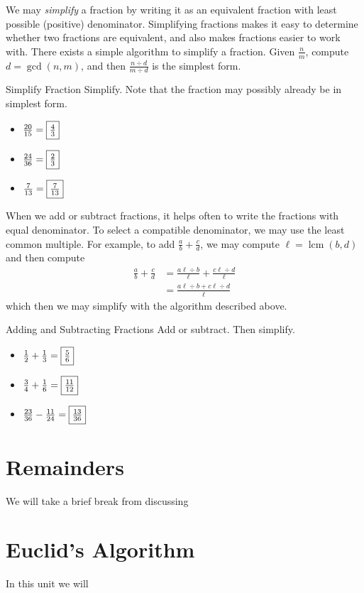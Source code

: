 \documentclass[a4paper,10pt]{report}
\begin{document}
We may \emph{simplify} a fraction by writing it as an equivalent fraction with
least possible (positive) denominator. Simplifying fractions makes it easy to
determine whether two fractions are equivalent, and also makes fractions easier
to work with. There exists a simple algorithm to simplify a fraction. Given
$\frac{n}{m}$, compute $d=\gcd(n, m)$, and then $\frac{n\div d}{m\div d}$ is the
simplest form.

\begin{problem}{Simplify Fraction}
 Simplify. Note that the fraction may possibly already be in simplest form.

 \begin{itemize}
  \item $\frac{20}{15}=\Ans{\frac{4}{3}}$
  \item $\frac{24}{36}=\Ans{\frac{2}{3}}$
  \item $\frac{7}{13}=\Ans{\frac{7}{13}}$
 \end{itemize}
\end{problem}

When we add or subtract fractions, it helps often to write the fractions with
equal denominator. To select a compatible denominator, we may use the least
common multiple. For example, to add $\frac{a}{b}+\frac{c}{d}$, we may compute
$\ell=\operatorname{lcm}(b, d)$ and then compute \begin{align*}
 \frac{a}{b}+\frac{c}{d}
 &= \frac{a\ell\div b}{\ell} + \frac{c\ell\div d}{\ell} \\
 &= \frac{a\ell\div b + c\ell\div d}{\ell}
\end{align*} which then we may simplify with the algorithm described above.

\begin{problem}{Adding and Subtracting Fractions}
 Add or subtract. Then simplify.

 \begin{itemize}
  \item $\frac{1}{2} + \frac{1}{3} = \Ans{\frac{5}{6}}$
  \item $\frac{3}{4} + \frac{1}{6} = \Ans{\frac{11}{12}}$
  \item $\frac{23}{36} - \frac{11}{24} = \Ans{\frac{13}{36}}$
 \end{itemize}
\end{problem}

\section{Remainders}
We will take a brief break from discussing 

\section{Euclid's Algorithm}
In this unit we will
\end{document}
